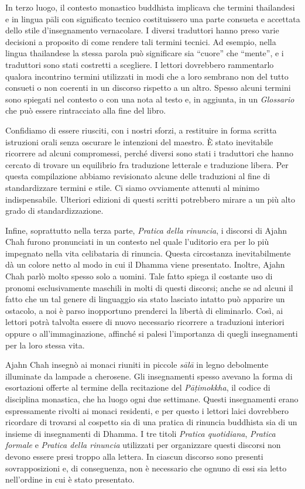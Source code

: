 In terzo luogo, il contesto monastico buddhista implicava che termini
thailandesi e in lingua pāli con significato tecnico costituissero una
parte consueta e accettata dello stile d'insegnamento vernacolare. I
diversi traduttori hanno preso varie decisioni a proposito di come
rendere tali termini tecnici. Ad esempio, nella lingua thailandese la
stessa parola può significare sia ``cuore'' che ``mente'', e i
traduttori sono stati costretti a scegliere. I lettori dovrebbero
rammentarlo qualora incontrino termini utilizzati in modi che a loro
sembrano non del tutto consueti o non coerenti in un discorso rispetto a
un altro. Spesso alcuni termini sono spiegati nel contesto o con una
nota al testo e, in aggiunta, in un \emph{Glossario} che può essere
rintracciato alla fine del libro.

Confidiamo di essere riusciti, con i nostri sforzi, a restituire in
forma scritta istruzioni orali senza oscurare le intenzioni del maestro.
È stato inevitabile ricorrere ad alcuni compromessi, perché diversi sono
stati i traduttori che hanno cercato di trovare un equilibrio fra
traduzione letterale e traduzione libera. Per questa compilazione
abbiamo revisionato alcune delle traduzioni al fine di standardizzare
termini e stile. Ci siamo ovviamente attenuti al minimo indispensabile.
Ulteriori edizioni di questi scritti potrebbero mirare a un più alto
grado di standardizzazione.

Infine, soprattutto nella terza parte, \emph{Pratica della rinuncia}, i
discorsi di Ajahn Chah furono pronunciati in un contesto nel quale
l'uditorio era per lo più impegnato nella vita celibataria di rinuncia.
Questa circostanza inevitabilmente dà un colore netto al modo in cui il
Dhamma viene presentato. Inoltre, Ajahn Chah parlò molto spesso solo a
uomini. Tale fatto spiega il costante uso di pronomi esclusivamente
maschili in molti di questi discorsi; anche se ad alcuni il fatto che un
tal genere di linguaggio sia stato lasciato intatto può apparire un
ostacolo, a noi è parso inopportuno prenderci la libertà di eliminarlo.
Così, ai lettori potrà talvolta essere di nuovo necessario ricorrere a
traduzioni interiori oppure o all'immaginazione, affinché si palesi
l'importanza di quegli insegnamenti per la loro stessa vita.

Ajahn Chah insegnò ai monaci riuniti in piccole \emph{sālā} in legno
debolmente illuminate da lampade a cherosene. Gli insegnamenti spesso
avevano la forma di esortazioni offerte al termine della recitazione del
\emph{Pāṭimokkha}, il codice di disciplina monastica, che ha luogo ogni
due settimane. Questi insegnamenti erano espressamente rivolti ai monaci
residenti, e per questo i lettori laici dovrebbero ricordare di trovarsi
al cospetto sia di una pratica di rinuncia buddhista sia di un insieme
di insegnamenti di Dhamma. I tre titoli \emph{Pratica quotidiana},
\emph{Pratica formale} e \emph{Pratica della rinuncia} utilizzati per
organizzare questi discorsi non devono essere presi troppo alla lettera.
In ciascun discorso sono presenti sovrapposizioni e, di conseguenza, non
è necessario che ognuno di essi sia letto nell'ordine in cui è stato
presentato.

